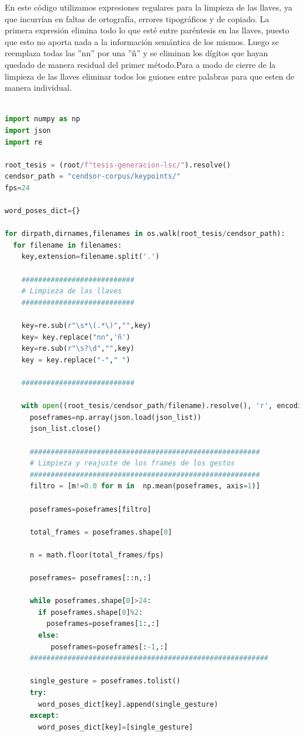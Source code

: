 En este código utilizamos expresiones regulares para la limpieza de las llaves, ya que incurrían en faltas de ortografía, errores tipográficos y de copiado.
La primera expresión elimina todo lo que esté entre paréntesis en las llaves, puesto que esto no aporta nada a la información semántica de los mismos. Luego se reemplaza todas las ''nn'' por una ''ñ'' 
y se eliminan los dígitos que hayan quedado de manera residual del primer método.Para a modo de cierre de la limpieza de las llaves eliminar todos los guiones entre palabras para que esten de manera individual.
\vspace{0.5cm}

\begin{lstlisting}[language=Python, caption={Cargar los json y limpiar las llaves}, label={code:load_and_clean}]

import numpy as np
import json
import re

root_tesis = (root/f"tesis-generacion-lsc/").resolve()
cendsor_path = "cendsor-corpus/keypoints/"
fps=24

word_poses_dict={}

for dirpath,dirnames,filenames in os.walk(root_tesis/cendsor_path):
  for filename in filenames:
    key,extension=filename.split('.')
	
	###########################
	# Limpieza de las llaves
	###########################
	
    key=re.sub(r"\s*\(.*\)","",key)
    key= key.replace("nn",'ñ')
    key=re.sub(r"\s?\d","",key)
    key = key.replace("-"," ") 
    
	###########################
	
    with open((root_tesis/cendsor_path/filename).resolve(), 'r', encoding='utf-8') as json_list:
      poseframes=np.array(json.load(json_list))
      json_list.close()
		
	  #######################################################
	  # Limpieza y reajuste de los frames de los gestos
	  #######################################################
      filtro = [m!=0.0 for m in  np.mean(poseframes, axis=1)]
      
      poseframes=poseframes[filtro]

      total_frames = poseframes.shape[0]

      n = math.floor(total_frames/fps)

      poseframes= poseframes[::n,:]

      while poseframes.shape[0]>24:
        if poseframes.shape[0]%2:
          poseframes=poseframes[1:,:]
        else:
           poseframes=poseframes[:-1,:]
	  #########################################################
	  
      single_gesture = poseframes.tolist()
      try:
        word_poses_dict[key].append(single_gesture)
      except:
        word_poses_dict[key]=[single_gesture]
        
\end{lstlisting}
